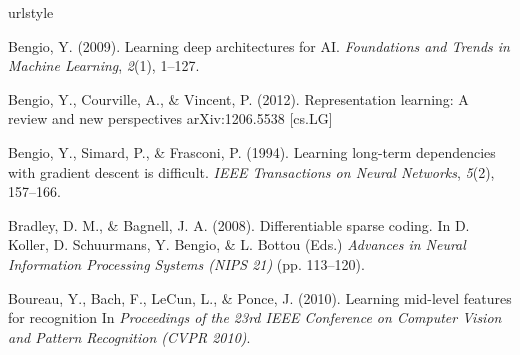 \documentclass{article} %
\begin{document}



\begin{thebibliography}{100}
\providecommand{\natexlab}[1]{#1}
\expandafter\ifx\csname urlstyle\endcsname\relax
  \providecommand{\doi}[1]{doi:\discretionary{}{}{}#1}\else
  \providecommand{\doi}{doi:\discretionary{}{}{}\begingroup
  \urlstyle{rm}\Url}\fi



Bengio, Y. (2009). 
\newblock Learning deep architectures for AI. 
\newblock \emph{Foundations and Trends in Machine Learning}, \emph{2}(1), 1--127.

Bengio, Y., Courville, A., \& Vincent, P. (2012).
\newblock Representation learning: A review and new perspectives
\newblock arXiv:1206.5538 [cs.LG]

Bengio, Y., Simard, P., \& Frasconi, P. (1994). 
\newblock Learning long-term dependencies with gradient descent is difficult. 
\newblock \emph{IEEE Transactions on Neural Networks}, \emph{5}(2), 157--166.


Bradley, D. M., \& Bagnell, J. A. (2008).
\newblock Differentiable sparse coding.
\newblock In D. Koller, D. Schuurmans, Y. Bengio, \& L. Bottou (Eds.) \emph{Advances in Neural Information Processing Systems (NIPS 21)} (pp. 113--120).

Boureau, Y., Bach, F., LeCun, L., \& Ponce, J. (2010).
\newblock Learning mid-level features for recognition
\newblock In \emph{Proceedings of the 23rd IEEE Conference on Computer Vision and Pattern Recognition (CVPR 2010)}.


\end{thebibliography}
\end{document}
